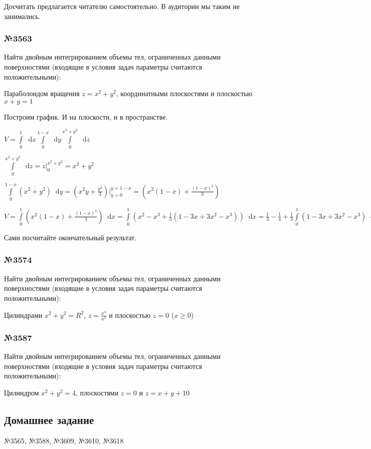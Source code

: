 \documentclass{article}
\newcommand*\diff{\mathop{}\!\mathrm{d}}
\begin{document}
Досчитать предлагается читателю самостоятельно. В аудитории мы таким не занимались.

\subsubsection{№3563}

Найти двойным интегрированием объемы тел, ограниченных данными поверхностями (входящие в условия задач параметры считаются положительными):

Параболоидом вращения $z = x^2 + y^2$, координатными плоскостями и плоскостью $x + y = 1$

Построим график. И на плоскости, и в пространстве.

$V = \int\limits_{0}^{1} \diff x \int\limits_{0}^{1-x} \diff y \int\limits_{0}^{x^2+y^2} \diff z$

$\int\limits_{0}^{x^2 + y^2} \diff z = z \bigg|_{0}^{x^2+y^2} = x^2 + y^2$

$\int\limits_{0}^{1 - x} (x^2+y^2) \diff y = (x^2 y + \frac{y^3}{3}) \bigg|_{y=0}^{y=1-x} = (x^2(1-x) + \frac{(1-x)^3}{3})$

$V = \int\limits_{0}^{1} (x^2(1-x) + \frac{(1-x)^3}{3}) \diff x = \int\limits_{0}^{1} (x^2 - x^3 + \frac{1}{3} (1-3x+3x^2-x^3)) \diff x = \frac{1}{3} - \frac{1}{4} + \frac{1}{3} \int\limits_{0}^{1} (1 - 3x + 3x^2 - x^3) \diff x = \frac{1}{3} - \frac{1}{4} + \frac{1}{3} (1 - \frac{3}{2} + 1 - \frac{1}{4}) = \dots$

Сами посчитайте окончательный результат.

\subsubsection{№3574}

Найти двойным интегрированием объемы тел, ограниченных данными поверхностями (входящие в условия задач параметры считаются положительными):

Цилиндрами $x^2 + y^2 = R^2$, $z = \frac{x^3}{a^2}$ и плоскостью $z = 0$ ($x \ge 0$)

\subsubsection{№3587}

Найти двойным интегрированием объемы тел, ограниченных данными поверхностями (входящие в условия задач параметры считаются положительными):

Цилиндром $x^2 + y^2 = 4$, плоскостями $z = 0$ и $z = x + y + 10$

\subsection{Домашнее задание}

№3565, №3588, №3609, №3610, №3618
\end{document}
